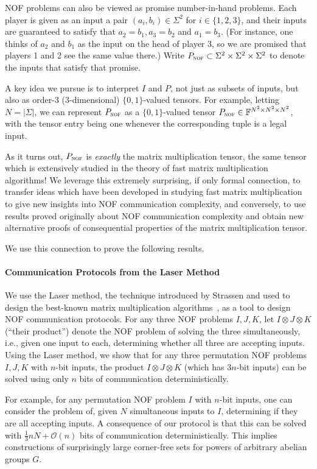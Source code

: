 \documentclass[10pt,a4paper]{article}
\newcommand{\F}{\mathbb{F}}
\newcommand{\Oh}{\mathcal{O}}
\newcommand{\mmP}{P_{\textsc{nof}}}
\begin{document}
NOF problems can also be viewed as promise number-in-hand problems. Each player is given as an input a pair $(a_i, b_i) \in \Sigma^2$ for $i \in \{1, 2,3\}$, and their inputs are guaranteed to satisfy that $a_2 = b_1, a_3 = b_2$ and $a_1 = b_3$. (For instance, one thinks of $a_2$ and $b_1$ as the input on the head of player 3, so we are promised that players 1 and 2 see the same value there.) Write $\mmP \subset \Sigma^2 \times \Sigma^2 \times \Sigma^2$ to denote the inputs that satisfy that promise.

A key idea we pursue is to interpret $I$ and $P$, not just as subsets of inputs, but also as order-3 (3-dimensional) $\{0,1\}$-valued tensors. For example, letting $N = |\Sigma|$, we can represent $\mmP$ as a $\{0,1\}$-valued tensor $\mmP \in \F^{N^2 \times N^2 \times N^2}$, with the tensor entry being one whenever the corresponding tuple is a legal input.

As it turns out, $\mmP$ is \emph{exactly} the matrix multiplication tensor, the same tensor which is extensively studied in the theory of fast matrix multiplication algorithms! We leverage this extremely surprising, if only formal connection, to transfer ideas which have been developed in studying fast matrix multiplication to give new insights into NOF communication complexity, and conversely, to use results proved originally about NOF communication complexity and obtain new alternative proofs of consequential properties of the matrix multiplication tensor.

We use this connection to prove the following results.

    \paragraph{Communication Protocols from the Laser Method} We use the Laser method, the technique introduced by Strassen and used to design the best-known matrix multiplication algorithms~\cite{S86,CW87}, as a tool to design NOF communication protocols. For any three NOF problems $I, J, K$, let $I \otimes J \otimes K$ (``their product'') denote the NOF problem of solving the three simultaneously, i.e., given one input to each, determining whether all three are accepting inputs. Using the Laser method, we show that for any three permutation NOF problems $I, J, K$ with $n$-bit inputs, the product $I \otimes J \otimes K$ (which has $3n$-bit inputs) can be solved using only $n$ bits of communication deterministically.
    
    For example, for any permutation NOF problem $I$ with $n$-bit inputs, one can consider the problem of, given $N$ simultaneous inputs to $I$, determining if they are all accepting inputs. A consequence of our protocol is that this can be solved with $\frac13 n N + \Oh(n)$ bits of communication deterministically. This implies constructions of surprisingly large corner-free sets for powers of arbitrary abelian groups $G$.
    
\end{document}
